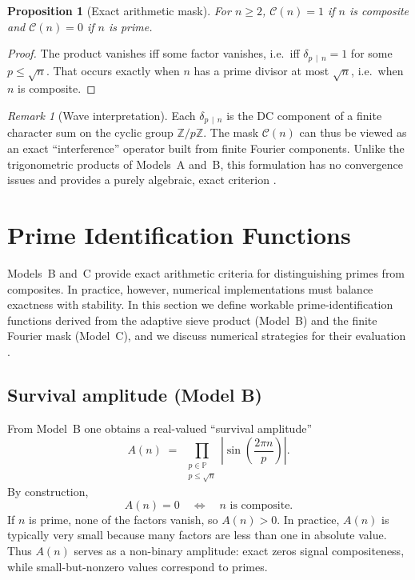 \documentclass[12pt]{article}
\newtheorem{proposition}{Proposition}
\theoremstyle{definition}
\theoremstyle{remark}
\newtheorem{remark}{Remark}
\newcommand{\Z}{\mathbb{Z}}
\newcommand{\Primes}{\mathbb{P}}
\newcommand{\divides}{\,\mid\,}
\begin{document}
\begin{proposition}[Exact arithmetic mask]
For \(n\ge 2\), \(\mathcal{C}(n)=1\) if \(n\) is composite and \(\mathcal{C}(n)=0\) if \(n\) is prime.
\end{proposition}
\begin{proof}
The product vanishes iff some factor vanishes, i.e.\ iff \(\delta_{p\divides n}=1\) for some \(p\le\sqrt{n}\). 
That occurs exactly when \(n\) has a prime divisor at most \(\sqrt{n}\), i.e.\ when \(n\) is composite.
\end{proof}

\begin{remark}[Wave interpretation]
Each \(\delta_{p\divides n}\) is the DC component of a finite character sum on the cyclic group \(\Z/p\Z\). 
The mask $\mathcal{C}(n)$ can thus be viewed as an exact “interference” operator built from finite Fourier components. 
Unlike the trigonometric products of Models~A and~B, this formulation has no convergence issues and provides a 
purely algebraic, exact criterion \citep{murty2008problems}.
\end{remark}

\section{Prime Identification Functions}
\label{sec:primeid}

Models~B and~C provide exact arithmetic criteria for distinguishing primes from composites. 
In practice, however, numerical implementations must balance exactness with stability. 
In this section we define workable prime-identification functions derived from the adaptive sieve 
product (Model~B) and the finite Fourier mask (Model~C), and we discuss numerical strategies for their evaluation 
\citep{hardy2008introduction,apostol1976introduction,tenenbaum2015analytic}.

\subsection{Survival amplitude (Model B)}

From Model~B one obtains a real-valued ``survival amplitude''
\[
A(n)\;=\;\prod_{\substack{p\in\Primes\\ p\le \sqrt{n}}}
\left|\sin\!\left(\frac{2\pi n}{p}\right)\right|.
\]
By construction,
\[
A(n)=0 \quad \iff \quad n \text{ is composite}.
\]
If $n$ is prime, none of the factors vanish, so $A(n)>0$. 
In practice, $A(n)$ is typically very small because many factors are less than one in absolute value. 
Thus $A(n)$ serves as a non-binary amplitude: exact zeros signal compositeness, while small-but-nonzero 
values correspond to primes.
\end{document}
